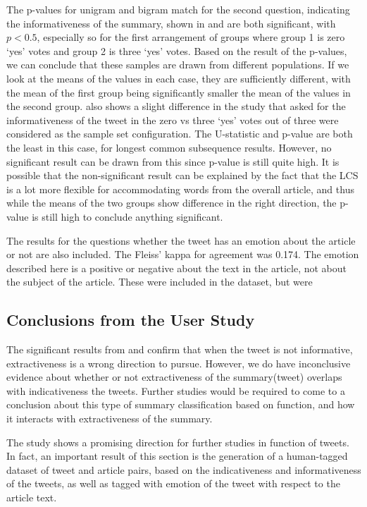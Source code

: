 The p-values for unigram and bigram match for the second question, indicating the informativeness of the summary, shown in  and  are both significant, with $p<0.5$, especially so for the first arrangement of groups where group 1 is zero `yes' votes and group 2 is three `yes' votes. Based on the result of the p-values, we can conclude that these samples are drawn from different populations. If we look at the means of the values in each case, they are sufficiently different, with the mean of the first group being significantly smaller the mean of the values in the second group.  also shows a slight difference in the study that asked for the informativeness of the tweet in the zero vs three `yes' votes out of three were considered as the sample set configuration. The U-statistic and p-value are both the least in this case, for longest common subsequence results. However, no significant result can be drawn from this since p-value is still quite high. It is possible that the non-significant result can be explained by the fact that the LCS is a lot more flexible for accommodating words from the overall article, and thus while the means of the two groups show difference in the right direction, the p-value is still high to conclude anything significant. 


The results for the questions whether the tweet has an emotion about the article or not are also included. The Fleiss' kappa for agreement was 0.174. The emotion described here is a positive or negative about the text in the article, not about the subject of the article. These were included in the dataset, but were 
 

\subsection{Conclusions from the User Study}

The significant results from  and  confirm that when the tweet is not informative, extractiveness is a wrong direction to pursue. However, we do have inconclusive evidence about whether or not extractiveness of the summary(tweet) overlaps with indicativeness the tweets. Further studies would be required to come to a conclusion about this type of summary classification based on function, and how it interacts with extractiveness of the summary. 

The study shows a promising direction for further studies in function of tweets. In fact, an important result of this section is the generation of a human-tagged dataset of tweet and article pairs, based on the indicativeness and informativeness of the tweets, as well as tagged with emotion of the tweet with respect to the article text. 

